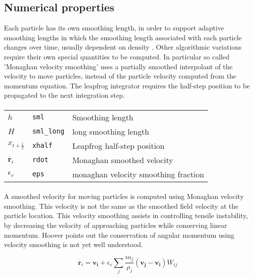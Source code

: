 \subsection{Numerical properties}
Each particle has its own smoothing length, in order to support adaptive
smoothing lengths in which the smoothing length associated with each particle
changes over time, usually dependent on density
\cite[]{sigalotti_shock-capturing_2006}.
Other algorithmic variations require their own special quantities to be
computed.  In particular so called 'Monaghan velocity smoothing' uses a
partially smoothed interpolant of the velocity to move particles, instead of
the particle velocity computed from the momentum equation. The leapfrog
integrator requires the half-step position to be propagated to the next
integration step.

\paragraph{}
\begin{tabularx}{\textwidth}{lll} \toprule
$h$ & \texttt{sml} & Smoothing length \\
$H$ & \texttt{sml\_long} & long smoothing length \\
$x_{t+\frac{1}{2}}$& \texttt{xhalf } &  Leapfrog half-step position \\
$\dot{\mathbold{r}_{i}}$ & \texttt{rdot } & Monaghan smoothed velocity\\
$\epsilon_{v}$ & \texttt{eps}        & monaghan velocity smoothing fraction\\
\end{tabularx}

\paragraph{}
A smoothed velocity for moving particles is computed using Monaghan velocity
smoothing. This velocity is not the same as the smoothed field velocity at the
particle location.  This velocity smoothing assists in controlling tensile
instability, by decreasing the velocity of approaching particles while
conserving linear momentum. Hoover points out the conservation of angular
momentum using velocity smoothing is not yet well understood.
\cite[]{hoover_smooth-particle_2004} \cite[]{monaghan_smoothed_1992}

\begin{equation}
\dot{\mathbold{r}_{i}} = \mathbold{v_{i}} + \epsilon_{v} 
\sum_{j} \frac{m_{j}}{\rho_{j}} \left( \mathbold{v_{j} - v_{i}} \right) W_{ij}
\end{equation}

